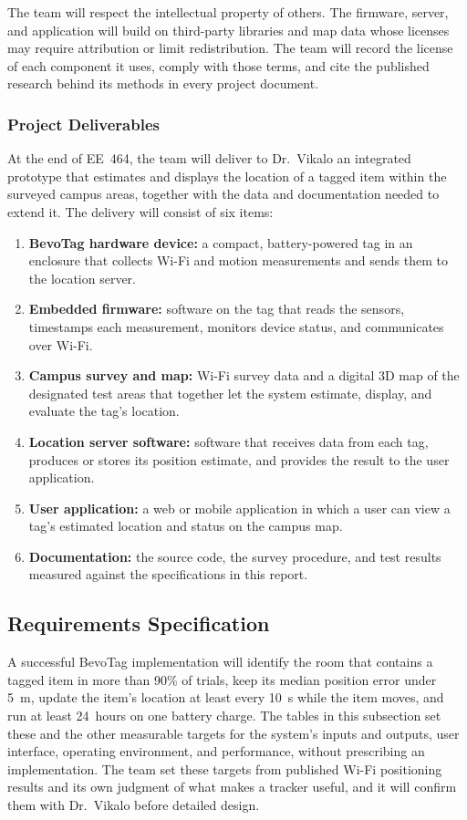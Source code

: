 \documentclass[12pt,letterpaper]{article}
\begin{document}
The team will respect the intellectual property of others. The firmware, server, and application
will build on third-party libraries and map data whose licenses may require attribution or limit
redistribution. The team will record the license of each component it uses, comply with those
terms, and cite the published research behind its methods in every project document.

\subsubsection{Project Deliverables}
At the end of EE~464, the team will deliver to Dr.\ Vikalo an integrated prototype that estimates
and displays the location of a tagged item within the surveyed campus areas, together with the data
and documentation needed to extend it. The delivery will consist of six items:
\begin{enumerate}
  \item \textbf{BevoTag hardware device:} a compact, battery-powered tag in an enclosure that
    collects Wi-Fi and motion measurements and sends them to the location server.
  \item \textbf{Embedded firmware:} software on the tag that reads the sensors, timestamps each
    measurement, monitors device status, and communicates over Wi-Fi.
  \item \textbf{Campus survey and map:} Wi-Fi survey data and a digital 3D map of the designated
    test areas that together let the system estimate, display, and evaluate the tag's location.
  \item \textbf{Location server software:} software that receives data from each tag, produces or
    stores its position estimate, and provides the result to the user application.
  \item \textbf{User application:} a web or mobile application in which a user can view a tag's
    estimated location and status on the campus map.
  \item \textbf{Documentation:} the source code, the survey procedure, and test results measured
    against the specifications in this report.
\end{enumerate}

\subsection{Requirements Specification}
A successful BevoTag implementation will identify the room that contains a tagged item in more than
90\% of trials, keep its median position error under 5~m, update the item's location at least every
10~s while the item moves, and run at least 24~hours on one battery charge. The tables in this
subsection set these and the other measurable targets for the system's inputs and outputs, user
interface, operating environment, and performance, without prescribing an implementation. The team
set these targets from published Wi-Fi positioning results \cite{rssi} and its own judgment of what
makes a tracker useful, and it will confirm them with Dr.\ Vikalo before detailed design.
\end{document}
